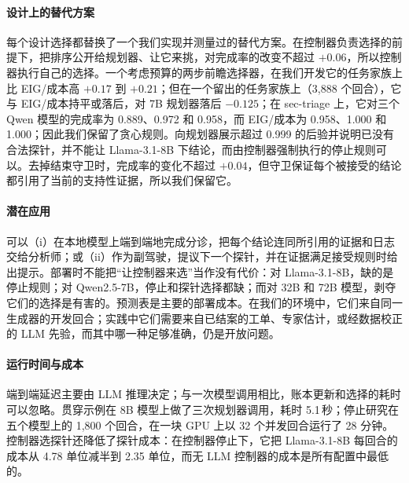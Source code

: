 \paragraph{设计上的替代方案} 每个设计选择都替换了一个我们实现并测量过的替代方案。在控制器负责选择的前提下，把排序公开给规划器、让它来挑，对完成率的改变不超过 $+0.06$，所以控制器执行自己的选择。一个考虑预算的两步前瞻选择器，在我们开发它的任务家族上比 EIG/成本高 $+0.17$ 到 $+0.21$；但在一个留出的任务家族上（3{,}888 个回合），它与 EIG/成本持平或落后，对 7B 规划器落后 $-0.125$；在 sec-triage 上，它对三个 Qwen 模型的完成率为 0.889、0.972 和 0.958，而 EIG/成本为 0.958、1.000 和 1.000；因此我们保留了贪心规则。向规划器展示超过 0.999 的后验并说明已没有合法探针，并不能让 Llama-3.1-8B 下结论，而由控制器强制执行的停止规则可以。去掉结束守卫时，完成率的变化不超过 $+0.04$，但守卫保证每个被接受的结论都引用了当前的支持性证据，所以我们保留它。

\paragraph{潜在应用} \hesp{} 可以（i）在本地模型上端到端地完成分诊，把每个结论连同所引用的证据和日志交给分析师；或（ii）作为副驾驶，提议下一个探针，并在证据满足接受规则时给出提示。部署时不能把“让控制器来选”当作没有代价：对 Llama-3.1-8B，缺的是停止规则；对 Qwen2.5-7B，停止和探针选择都缺；而对 32B 和 72B 模型，剥夺它们的选择是有害的。预测表是主要的部署成本。在我们的环境中，它们来自同一生成器的开发回合；实践中它们需要来自已结案的工单、专家估计，或经数据校正的 LLM 先验，而其中哪一种足够准确，仍是开放问题。

\paragraph{运行时间与成本} 端到端延迟主要由 LLM 推理决定；与一次模型调用相比，账本更新和选择的耗时可以忽略。贯穿示例在 8B 模型上做了三次规划器调用，耗时 5.1\,秒；停止研究在五个模型上的 1{,}800 个回合，在一块 GPU 上以 32 个并发回合运行了 28 分钟。控制器选探针还降低了探针成本：在控制器停止下，它把 Llama-3.1-8B 每回合的成本从 4.78 单位减半到 2.35 单位，而无 LLM 控制器的成本是所有配置中最低的。
